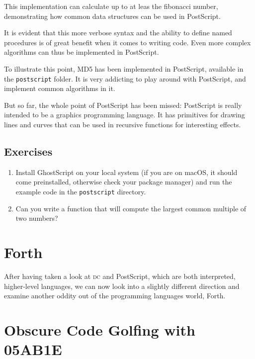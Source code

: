\documentclass[a4paper,twocolumn]{article}
\begin{document}
This implementation can calculate up to at leas the  fibonacci number, demonstrating how common data structures can be used in PostScript.

It is evident that this more verbose syntax and the ability to define named procedures is of great benefit when it comes to writing code. Even more complex algorithms can thus be implemented in PostScript.

To illustrate this point, MD5 has been implemented in PostScript, available in the \verb|postscript| folder. It is very addicting to play around with PostScript, and implement common algorithms in it.

But so far, the whole point of PostScript has been missed: PostScript is really intended to be a graphics programming language. It has primitives for drawing lines and curves that can be used in recursive functions for interesting effects.


\subsection*{Exercises}

\begin{enumerate}
  \item Install GhostScript on your local system (if you are on macOS, it should come preinstalled, otherwise check your package manager) and run the example code in the \verb|postscript| directory.
 
  \item Can you write a function that will compute the largest common multiple of two numbers?
\end{enumerate}

\section{Forth}

After having taken a look at \textsc{dc} and PostScript, which are both interpreted, higher-level languages, we can now look into a slightly different direction and examine another oddity out of the programming languages world, Forth. 

\section{Obscure Code Golfing with 05AB1E}
\end{document}
